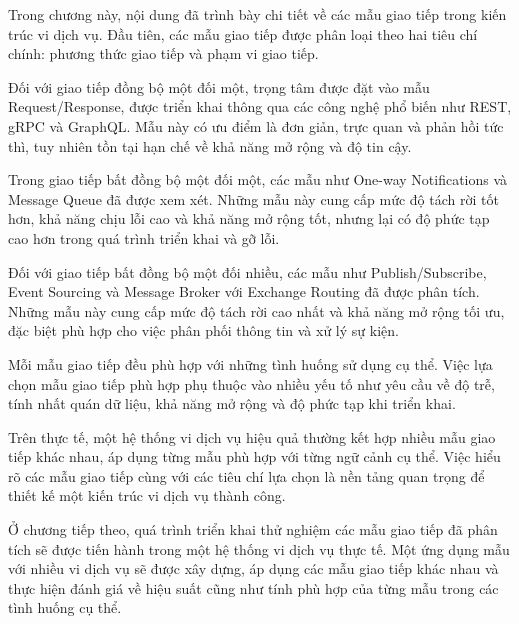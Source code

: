 Trong chương này, nội dung đã trình bày chi tiết về các mẫu giao tiếp trong kiến trúc vi dịch vụ. Đầu tiên, các mẫu giao tiếp được phân loại theo hai tiêu chí chính: phương thức giao tiếp và phạm vi giao tiếp.

Đối với giao tiếp đồng bộ một đối một, trọng tâm được đặt vào mẫu Request/Response, được triển khai thông qua các công nghệ phổ biến như REST, gRPC và GraphQL. Mẫu này có ưu điểm là đơn giản, trực quan và phản hồi tức thì, tuy nhiên tồn tại hạn chế về khả năng mở rộng và độ tin cậy.

Trong giao tiếp bất đồng bộ một đối một, các mẫu như One-way Notifications và Message Queue đã được xem xét. Những mẫu này cung cấp mức độ tách rời tốt hơn, khả năng chịu lỗi cao và khả năng mở rộng tốt, nhưng lại có độ phức tạp cao hơn trong quá trình triển khai và gỡ lỗi.

Đối với giao tiếp bất đồng bộ một đối nhiều, các mẫu như Publish/Subscribe, Event Sourcing và Message Broker với Exchange Routing đã được phân tích. Những mẫu này cung cấp mức độ tách rời cao nhất và khả năng mở rộng tối ưu, đặc biệt phù hợp cho việc phân phối thông tin và xử lý sự kiện.

Mỗi mẫu giao tiếp đều phù hợp với những tình huống sử dụng cụ thể. Việc lựa chọn mẫu giao tiếp phù hợp phụ thuộc vào nhiều yếu tố như yêu cầu về độ trễ, tính nhất quán dữ liệu, khả năng mở rộng và độ phức tạp khi triển khai.

Trên thực tế, một hệ thống vi dịch vụ hiệu quả thường kết hợp nhiều mẫu giao tiếp khác nhau, áp dụng từng mẫu phù hợp với từng ngữ cảnh cụ thể. Việc hiểu rõ các mẫu giao tiếp cùng với các tiêu chí lựa chọn là nền tảng quan trọng để thiết kế một kiến trúc vi dịch vụ thành công.

Ở chương tiếp theo, quá trình triển khai thử nghiệm các mẫu giao tiếp đã phân tích sẽ được tiến hành trong một hệ thống vi dịch vụ thực tế. Một ứng dụng mẫu với nhiều vi dịch vụ sẽ được xây dựng, áp dụng các mẫu giao tiếp khác nhau và thực hiện đánh giá về hiệu suất cũng như tính phù hợp của từng mẫu trong các tình huống cụ thể.
